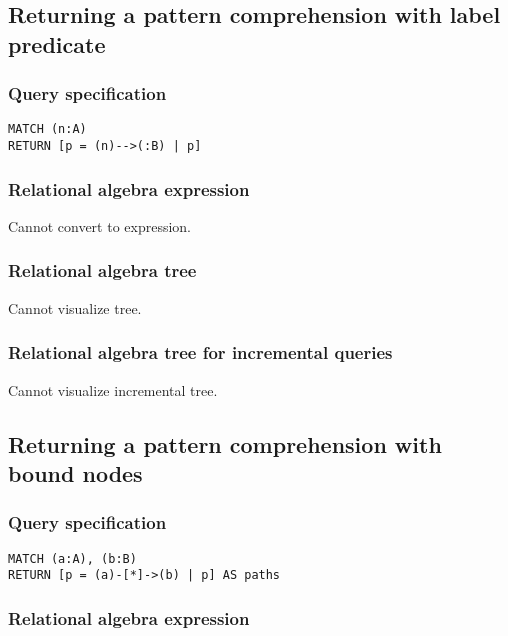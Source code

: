 \subsection{Returning a pattern comprehension with label predicate}

\subsubsection*{Query specification}

\begin{lstlisting}
MATCH (n:A)
RETURN [p = (n)-->(:B) | p]
\end{lstlisting}

\subsubsection*{Relational algebra expression}

Cannot convert to expression.

\subsubsection*{Relational algebra tree}

Cannot visualize tree.

\subsubsection*{Relational algebra tree for incremental queries}

Cannot visualize incremental tree.

\subsection{Returning a pattern comprehension with bound nodes}

\subsubsection*{Query specification}

\begin{lstlisting}
MATCH (a:A), (b:B)
RETURN [p = (a)-[*]->(b) | p] AS paths
\end{lstlisting}

\subsubsection*{Relational algebra expression}

